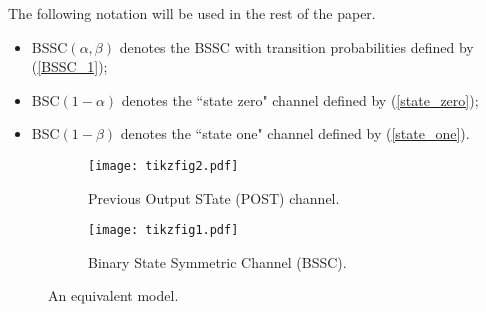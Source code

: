 \documentclass[11pt, a4paper, journal,onecolumn]{IEEEtran}
\begin{document}
\par The following notation will be used in the rest of the paper. 
\begin{itemize}
\item BSSC$(\alpha,\beta)$ denotes the BSSC with transition probabilities defined by (\ref{BSSC_1});
\item BSC$(1-\alpha)$ denotes the ``state zero" channel defined by (\ref{state_zero});
\item BSC$(1-\beta)$ denotes the ``state one" channel defined by (\ref{state_one}).
\end{itemize}
\begin{figure}
    \centering
    \begin{subfigure}[b]{0.49\textwidth}
        \centering
        \texttt{[image: tikzfig2.pdf]}
        \caption{Previous Output STate (POST) channel.}\label{fig.DP.bssc.con.cap_a}
    \end{subfigure}
    \hfill
    \begin{subfigure}[b]{0.49\textwidth}
        \centering
        \texttt{[image: tikzfig1.pdf]}      
        \caption{Binary State Symmetric Channel (BSSC).}\label{fig.DP.bssc.con.cap_b}
    \end{subfigure}
    \caption{An equivalent model.}\label{fig.equiv.model}
\end{figure}
\end{document}
